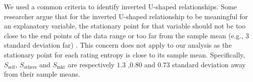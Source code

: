 \documentclass[msom,blindrev]{informs3}
\begin{document}
	
	We used a common criteria to identify inverted U-shaped relationships.  Some researcher argue that for the inverted U-shaped relationship to be meaningful for an explanatory variable, the stationary point for that variable should not be too close to the end points of the data range or too far from the sample mean (e.g., 3 standard deviation far) \citep{lind2010or}. This concern does not apply to our analysis as the stationary point for each rating entropy is close to its sample mean. Specifically, $S_{\text{self}}$, $S_{\text{others}}$ and $S_{\text{mkt}}$ are respectively $1.3$ ,$0.80$ and  $0.73$  standard deviation away from their sample means.
	
	
	
	
	
	
	
	
	
\end{document}
